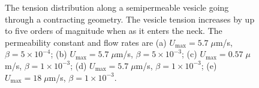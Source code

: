\documentclass[prb,preprint,showpacs,preprintnumbers,amsmath,amssymb,longbibliography]{revtex4-1}
\begin{document}
\begin{figure}[htp]
  \centering
  \caption{\label{fig:contractingTensions1} The tension distribution
  along a semipermeable vesicle going through a contracting geometry.
  The vesicle tension increases by up to five orders of magnitude when
  as it enters the neck. The permeability constant and flow rates are
  (a) $U_{\max} = 5.7\;\mu$m/s, $\beta = 5 \times 10^{-4}$; (b)
  $U_{\max} = 5.7\;\mu$m/s, $\beta = 5 \times 10^{-3}$; (c) $U_{\max} =
  0.57\;\mu$m/s, $\beta = 1 \times 10^{-3}$; (d) $U_{\max} =
  5.7\;\mu$m/s, $\beta = 1 \times 10^{-3}$; (e) $U_{\max} = 18\;\mu$m/s,
  $\beta = 1 \times 10^{-3}$.}
\end{figure}
\end{document}
